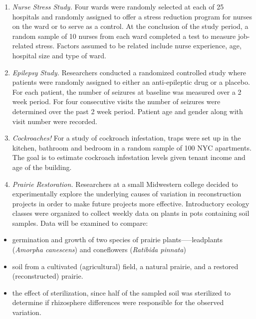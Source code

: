 \documentclass[
]{krantz}
\providecommand{\tightlist}{%
  \setlength{\itemsep}{0pt}\setlength{\parskip}{0pt}}
\begin{document}
\begin{enumerate}
\def\labelenumi{\alph{enumi}.}
\item
  \emph{Nurse Stress Study.} Four wards were randomly selected at each of 25 hospitals and randomly assigned to offer a stress reduction program for nurses on the ward or to serve as a control. At the conclusion of the study period, a random sample of 10 nurses from each ward completed a test to measure job-related stress. Factors assumed to be related include nurse experience, age, hospital size and type of ward.
\item
  \emph{Epilepsy Study.} Researchers conducted a randomized controlled study where patients were randomly assigned to either an anti-epileptic drug or a placebo. For each patient, the number of seizures at baseline was measured over a 2 week period. For four consecutive visits the number of seizures were determined over the past 2 week period. Patient age and gender along with visit number were recorded.
\item
  \emph{Cockroaches!} For a study of cockroach infestation, traps were set up in the kitchen, bathroom and bedroom in a random sample of 100 NYC apartments. The goal is to estimate cockroach infestation levels given tenant income and age of the building.
\item
  \emph{Prairie Restoration.} Researchers at a small Midwestern college decided to experimentally explore the underlying causes of variation in reconstruction projects in order to make future projects more effective. Introductory ecology classes were organized to collect weekly data on plants in pots containing soil samples. Data will be examined to compare:
\end{enumerate}

\begin{itemize}
\tightlist
\item
  germination and growth of two species of prairie plants-----leadplants (\emph{Amorpha canescens}) and coneflowers (\emph{Ratibida pinnata})
\item
  soil from a cultivated (agricultural) field, a natural prairie, and a restored (reconstructed) prairie.\\
\item
  the effect of sterilization, since half of the sampled soil was sterilized to determine if rhizosphere differences were responsible for the observed variation.
\end{itemize}
\end{document}
